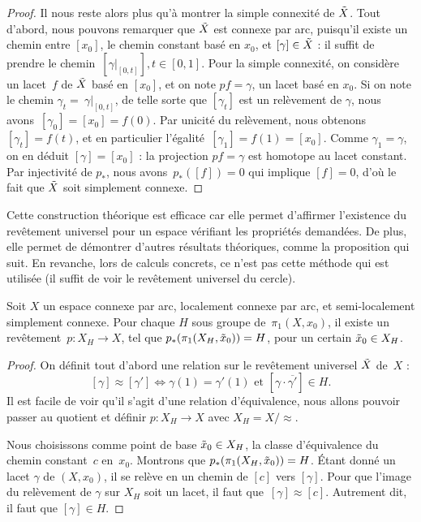 \begin{proof}
\bigskip Il nous reste alors plus qu'à montrer la simple connexité de $\Tilde{X}$. Tout d'abord, nous pouvons remarquer que $\Tilde{X}$ est connexe par arc, puisqu'il existe un chemin entre $[x_0]$, le chemin constant basé en $x_0$, et $[\gamma]\in \Tilde{X}$ : il suffit de prendre le chemin~$[\gamma|_{[0,t]}], t\in[0,1]$. Pour la simple connexité, on considère un lacet~$f$ de $\Tilde{X}$ basé en $[x_0]$, et on note $pf=\gamma$, un lacet basé en $x_0$. Si on note le chemin $\gamma_t=~\gamma|_{[0,t]}$, de telle sorte que $[\gamma_t]$ est un relèvement de $\gamma$, nous avons~$[\gamma_0]=[x_0]=f(0)$. Par unicité du relèvement, nous obtenons $[\gamma_t]=f(t)$, et en particulier l'égalité~$[\gamma_1]=f(1)=[x_0]$. Comme $\gamma_1=\gamma$, on en déduit $[\gamma]=[x_0]$ : la projection $pf=\gamma$ est homotope au lacet constant. Par injectivité de $p_\ast$, nous avons~$p_\ast([f])=0$ qui implique $[f]=0$, d'où le fait que $\Tilde{X}$ soit simplement connexe.
\end{proof}

Cette construction théorique est efficace car elle permet d'affirmer l'existence du revêtement universel pour un espace vérifiant les propriétés demandées. De plus, elle permet de démontrer d'autres résultats théoriques, comme la proposition qui suit. En revanche, lors de calculs concrets, ce n'est pas cette méthode qui est utilisée (il suffit de voir le revêtement universel du cercle).

\begin{proposition}
Soit $X$ un espace connexe par arc, localement connexe par arc, et semi-localement simplement connexe. Pour chaque $H$ sous groupe de~$\pi_1(X,x_0)$, il existe un revêtement~${p:X_H\to X}$, tel que $p_\ast(\pi_1(X_H,\Tilde{x}_0))=H$, pour un certain $\Tilde{x}_0\in X_H$.
\end{proposition}
\begin{proof}
On définit tout d'abord une relation sur le revêtement universel $\Tilde{X}$ de~$X$ : \[[\gamma]\approx[\gamma']\Longleftrightarrow\gamma(1)=\gamma'(1)\text{ et }[\gamma\cdot\overline{\gamma'}]\in H.\]Il est facile de voir qu'il s'agit d'une relation d'équivalence, nous allons pouvoir passer au quotient et définir $p:X_H\to X$ avec $X_H=X/\approx$.

Nous choisissons comme point de base $\Tilde{x}_0\in X_H$, la classe d'équivalence du chemin constant~$c$ en~$x_0$. Montrons que $p_\ast(\pi_1(X_H,\Tilde{x}_0))=H$. Étant donné un lacet $\gamma$ de $(X,x_0)$, il se relève en un chemin de $[c]$ vers $[\gamma]$. Pour que l'image du relèvement de $\gamma$ sur $X_H$ soit un lacet, il faut que~$[\gamma]\approx[c]$. Autrement dit, il faut que $[\gamma]\in H$.
\end{proof}

